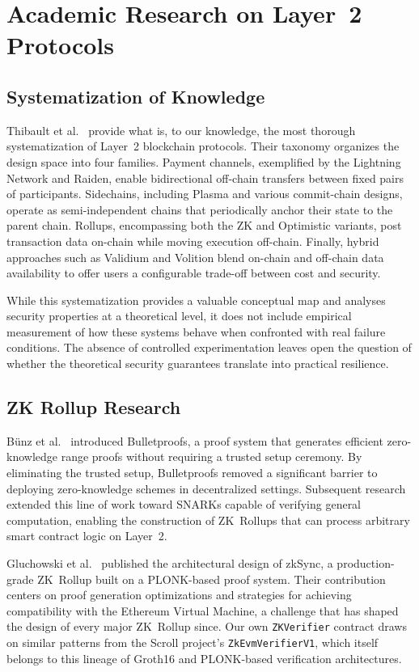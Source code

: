 \documentclass[
]{elteikthesis}[2024/04/26]
\begin{document}
\section{Academic Research on Layer~2 Protocols}

\subsection{Systematization of Knowledge}

Thibault et al.~\cite{sok-layer2} provide what is, to our knowledge, the most thorough systematization of Layer~2 blockchain protocols. Their taxonomy organizes the design space into four families. Payment channels, exemplified by the Lightning Network and Raiden, enable bidirectional off-chain transfers between fixed pairs of participants. Sidechains, including Plasma and various commit-chain designs, operate as semi-independent chains that periodically anchor their state to the parent chain. Rollups, encompassing both the ZK and Optimistic variants, post transaction data on-chain while moving execution off-chain. Finally, hybrid approaches such as Validium and Volition blend on-chain and off-chain data availability to offer users a configurable trade-off between cost and security.

While this systematization provides a valuable conceptual map and analyses security properties at a theoretical level, it does not include empirical measurement of how these systems behave when confronted with real failure conditions. The absence of controlled experimentation leaves open the question of whether the theoretical security guarantees translate into practical resilience.

\subsection{ZK Rollup Research}

B\"unz et al.~\cite{zk-efficient-proofs} introduced Bulletproofs, a proof system that generates efficient zero-knowledge range proofs without requiring a trusted setup ceremony. By eliminating the trusted setup, Bulletproofs removed a significant barrier to deploying zero-knowledge schemes in decentralized settings. Subsequent research extended this line of work toward SNARKs capable of verifying general computation, enabling the construction of ZK~Rollups that can process arbitrary smart contract logic on Layer~2.

Gluchowski et al.~\cite{zksync-paper} published the architectural design of zkSync, a production-grade ZK~Rollup built on a PLONK-based proof system. Their contribution centers on proof generation optimizations and strategies for achieving compatibility with the Ethereum Virtual Machine, a challenge that has shaped the design of every major ZK~Rollup since. Our own \texttt{ZKVerifier} contract draws on similar patterns from the Scroll project's \texttt{ZkEvmVerifierV1}, which itself belongs to this lineage of Groth16 and PLONK-based verification architectures.
\end{document}
